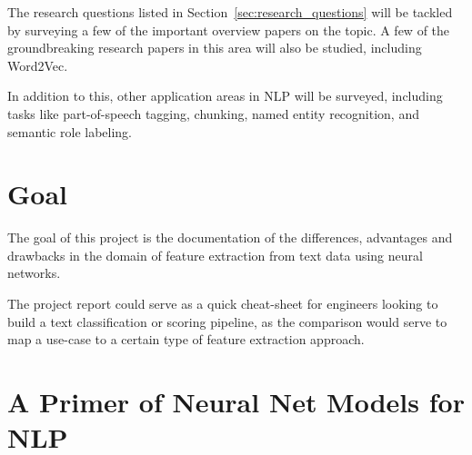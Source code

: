 \documentclass[11pt,a4paper]{article}
\begin{document}
  The research questions listed in Section~\ref{sec:research_questions} will be tackled by surveying a few of the important overview papers on the topic\cite{goldberg2016primer}\cite{bengio2003neural}\cite{morin2005hierarchical}. A few of the groundbreaking research papers in this area will also be studied, including Word2Vec\cite{mikolov2013efficient}\cite{mikolov2013distributed}\cite{mikolov2013linguistic}.

  In addition to this, other application areas in NLP will be surveyed, including tasks like part-of-speech tagging, chunking, named entity recognition, and semantic role labeling. \cite{socher2011parsing}\cite{luong2013better}\cite{maas2015lexicon}\cite{li2015hierarchical}\cite{collobert2011natural}\cite{pennington2014glove}


\section{Goal} %
\label{sec:goal}

  The goal of this project is the documentation of the differences, advantages and drawbacks in the domain of feature extraction from text data using neural networks. 

  The project report could serve as a quick cheat-sheet for engineers looking to build a text classification or scoring pipeline, as the comparison would serve to map a use-case to a certain type of feature extraction approach.



\newpage


\section{A Primer of Neural Net Models for NLP} %
\label{sec:a_primer_of_neural_net_models_for_nlp}
\end{document}
